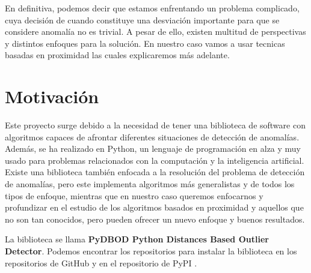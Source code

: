 En definitiva, podemos decir que estamos enfrentando un problema complicado, cuya decisión de cuando constituye una desviación importante 
para que se considere anomalía no es trivial. A pesar de ello, existen multitud de perspectivas y distintos enfoques para la solución.
En nuestro caso vamos a usar tecnicas basadas en proximidad las cuales explicaremos más adelante.


\section{Motivación}

Este proyecto surge debido a la necesidad de tener una biblioteca de software con algoritmos capaces de afrontar diferentes situaciones de
detección de anomalías. Además, se ha realizado en Python, un lenguaje de programación en alza y muy usado para problemas relacionados con
la computación y la inteligencia artificial. Existe una biblioteca  también
enfocada a la resolución del problema de detección de anomalías\cite{zhaoPyODPythonToolbox2019}, pero este implementa
algoritmos más generalistas y de todos los tipos de enfoque, mientras que en 
nuestro caso queremos enfocarnos y profundizar en el estudio de los algoritmos 
basados en proximidad y aquellos que no son tan conocidos, pero pueden ofrecer un nuevo enfoque y buenos resultados.

La biblioteca se llama \textbf{PyDBOD Python Distances Based Outlier Detector}. Podemos encontrar los repositorios para 
instalar la biblioteca en los repositorios de GitHub \cite{Miki97TFGOutlierDetectionHttps} y en el repositorio de 
PyPI \cite{PyDBODDistancesBased}.